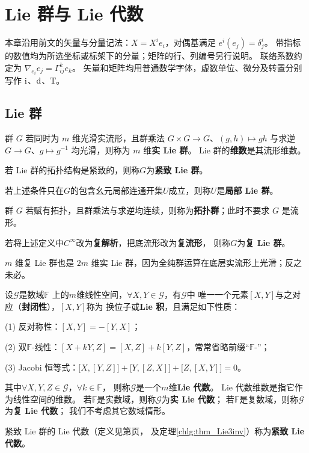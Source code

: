 \chapter{Lie 群与 Lie 代数}\label{appx:Lie-group}

本章沿用前文的矢量与分量记法：$X=X^i e_i$，对偶基满足 $e^i(e_j)=\delta^i_j$。
带指标的数值均为所选坐标或标架下的分量；矩阵的行、列编号另行说明。
联络系数约定为 $\nabla_{e_i}e_j=\Gamma^k_{ij}e_k$。
矢量和矩阵均用普通数学字体，虚数单位、微分及转置分别写作 $\mathrm{i}$、$\dd$、$\mathrm T$。

\section{Lie 群}\label{chlg:sec_definition}

\begin{definition}\label{chlg:def_lg}
    群 $G$ 若同时为 $m$ 维光滑实流形，且群乘法 $G\times G\to G$、$(g,h)\mapsto gh$
    与求逆 $G\to G$、$g\mapsto g^{-1}$ 均光滑，则称为 $m$ 维\textbf{实 Lie 群}。
    Lie 群的\textbf{维数}是其流形维数。

    若 Lie 群的拓扑结构是紧致的，则称$G$为\textbf{紧致 Lie 群}。

    若上述条件只在$G$的包含幺元局部连通开集$U$成立，则称$U$是\textbf{局部 Lie 群}。

    群 $G$ 若赋有拓扑，且群乘法与求逆均连续，则称为\textbf{拓扑群}；此时不要求 $G$ 是流形。

    若将上述定义中$C^\infty$改为\textbf{复解析}，把底流形改为\textbf{复流形}，
    则称$G$为\textbf{复 Lie 群}。
\end{definition}

$m$ 维复 Lie 群也是 $2m$ 维实 Lie 群，因为全纯群运算在底层实流形上光滑；反之未必。

\begin{definition}\label{chlg:def_la}
    设$\mathscr{G}$是数域$\mathbb{F}$
    上的$m$维线性空间，$\forall X,Y \in \mathscr{G}$，有$\mathscr{G}$中
    唯一一个元素$[X,Y]$与之对应（\textbf{封闭性}），$[X,Y]$称为
    换位子或\textbf{Lie 积}，且满足如下性质：

    (1) 反对称性：$[X,Y]=-[Y,X]$；

    (2) 双$\mathbb{F}$-线性：$[ X + k Y, Z]= [X, Z]+ k[Y, Z]$，常常省略前缀“$\mathbb{F}$-”；

    (3) Jacobi 恒等式：$\bigl[X,[Y,Z]\bigr]+\bigl[Y,[Z,X]\bigr]+\bigl[Z,[X,Y]\bigr]=0$。

\noindent    其中$\forall X, Y, Z \in \mathscr{G}$，$\forall k \in \mathbb{F}$，
    则称$\mathscr{G}$是一个$m$维\textbf{Lie 代数}。
     Lie 代数维数是指它作为线性空间的维数。
    若$\mathbb{F}$是实数域，则称$\mathscr{G}$为\textbf{实 Lie 代数}；
    若$\mathbb{F}$是复数域，则称$\mathscr{G}$为\textbf{复 Lie 代数}；
    我们不考虑其它数域情形。

    紧致 Lie 群的 Lie 代数（定义见第\pageref{chlg:eqn_LgXY}页，
    及定理\ref{chlg:thm_Lie3inv}）称为\textbf{紧致 Lie 代数}。
\end{definition}

